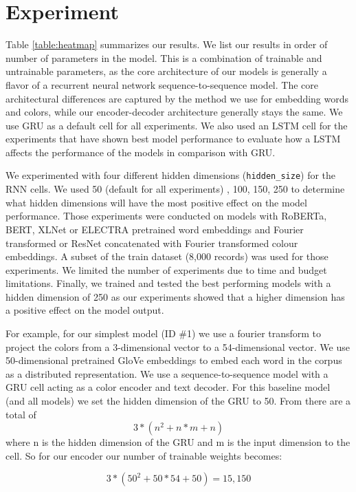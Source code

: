 \section{Experiment}

Table \ref{table:heatmap} summarizes our results. We list our results in order of number of parameters in the model. This is a combination of trainable and untrainable parameters, as the core architecture of our models is generally a flavor of a recurrent neural network sequence-to-sequence model. The core architectural differences are captured by the method we use for embedding words and colors, while our encoder-decoder architecture generally stays the same. We use GRU as a default cell for all experiments. We also used an LSTM cell for the experiments that have shown best model performance to evaluate how a LSTM affects the performance of the models in comparison with GRU.

\par
We experimented with four different hidden dimensions (\texttt{hidden\_size}) for the RNN cells. We used 50 (default for all experiments) , 100, 150, 250 to determine what hidden dimensions will have the most positive effect on the model performance. Those experiments were conducted on models with RoBERTa, BERT, XLNet or ELECTRA pretrained word embeddings and Fourier transformed or ResNet concatenated with Fourier transformed colour embeddings. A subset of the train dataset (8,000 records) was used for those experiments. We limited the number of experiments due to time and budget limitations. Finally, we trained and tested the best performing models with a hidden dimension of 250 as our experiments showed that a higher dimension has a positive effect on the model output.

\par
For example, for our simplest model (ID \#1) we use a fourier transform to project the colors from a 3-dimensional vector to a 54-dimensional vector. We use 50-dimensional pretrained GloVe embeddings to embed each word in the corpus as a distributed representation. We use a sequence-to-sequence model with a GRU cell acting as a color encoder and text decoder.  For this baseline model (and all models) we set the hidden dimension of the GRU to 50. From \citep{dey-2017-gru} there are a total of \[3*(n^2 + n*m +n)\] where n is the hidden dimension of the GRU and m is the input dimension to the cell. So for our encoder our number of trainable weights becomes:

\[3*(50^2 + 50*54 +50) = 15,150\]

